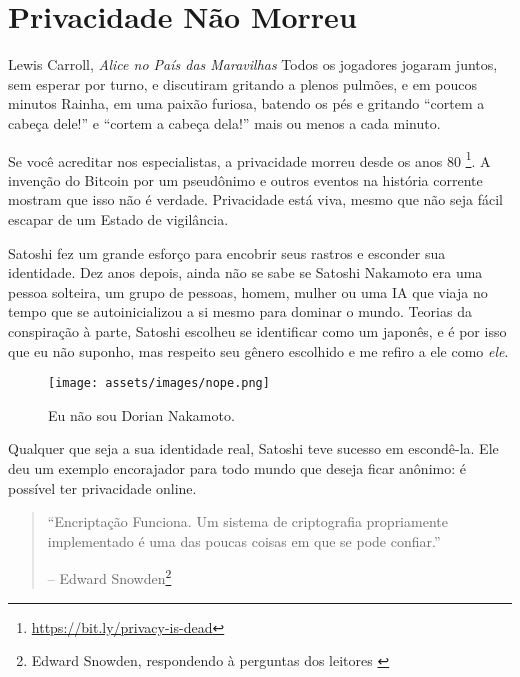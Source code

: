 \chapter{Privacidade Não Morreu}
\label{les:19}

\begin{chapquote}{Lewis Carroll, \textit{Alice no País das Maravilhas}}
	Todos os jogadores jogaram juntos, sem esperar por turno, e discutiram 
	gritando a plenos pulmões, e em poucos minutos Rainha, em uma paixão 
	furiosa, batendo os pés e gritando \enquote{cortem a cabeça dele!} e 
	\enquote{cortem a cabeça dela!} mais ou menos a cada minuto.
\end{chapquote}

Se você acreditar nos especialistas, a privacidade morreu desde os anos 80
\footnote{\url{https://bit.ly/privacy-is-dead}}. A invenção do Bitcoin por um 
pseudônimo e outros eventos na história corrente mostram que isso não é verdade.
Privacidade está viva, mesmo que não seja fácil escapar de um Estado de vigilância. 

Satoshi fez um grande esforço para encobrir seus rastros e esconder
sua identidade. Dez anos depois, ainda não se sabe se Satoshi Nakamoto era uma pessoa 
solteira, um grupo de pessoas, homem, mulher ou uma IA que viaja no tempo que se 
autoinicializou a si mesmo para dominar o mundo. Teorias da conspiração à parte, Satoshi 
escolheu se identificar como um japonês, e é por isso que eu não suponho, mas respeito seu 
gênero escolhido e me refiro a ele como \textit{ele}. 

\begin{figure}
  \texttt{[image: assets/images/nope.png]}
  \caption{Eu não sou Dorian Nakamoto.}
  \label{fig:nope}
\end{figure}

Qualquer que seja a sua identidade real, Satoshi teve sucesso em escondê-la. 
Ele deu um exemplo encorajador para todo mundo que deseja ficar anônimo: 
é possível ter privacidade online.

\begin{quotation}\begin{samepage}
\enquote{Encriptação Funciona. Um sistema de criptografia propriamente implementado é 
	uma das poucas coisas em que se pode confiar.}
\begin{flushright} -- Edward Snowden\footnote{Edward Snowden, respondendo à perguntas dos leitores \cite{snowden}}
\end{flushright}\end{samepage}\end{quotation}

